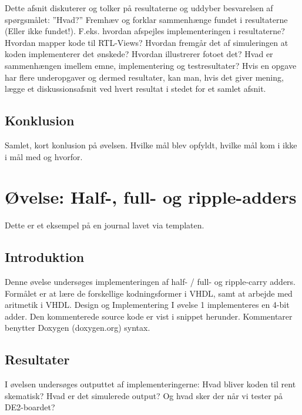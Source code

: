 \documentclass[12pt,a4paper]{article}
\begin{document}
Dette afsnit diskuterer og tolker på resultaterne og uddyber besvarelsen af
spørgsmålet: ”Hvad?” Fremhæv og forklar sammenhænge fundet i resultaterne
(Eller ikke fundet!).  F.eks.  hvordan afspejles implementeringen i
resultaterne?  Hvordan mapper kode til RTL-Views?  Hvordan fremgår det af
simuleringen at koden implementerer det ønskede?  Hvordan illustrerer fotoet
det?  Hvad er sammenhængen imellem emne, implementering og testresultater? 
Hvis en opgave har flere underopgaver og dermed resultater, kan man, hvis
det giver mening, lægge et diskussionsafsnit ved hvert resultat i stedet for
et samlet afsnit.

\subsection{Konklusion}

Samlet, kort konlusion på øvelsen.  Hvilke mål blev opfyldt, hvilke mål kom
i ikke i mål med og hvorfor.

\section{Øvelse: Half-, full- og ripple-adders}

Dette er et eksempel på en journal lavet via templaten.

\subsection{Introduktion}

Denne øvelse undersøges implementeringen af half- / full- og ripple-carry
adders.  Formålet er at lære de forskellige kodningsformer i VHDL, samt at
arbejde med aritmetik i VHDL.  Design og Implementering I øvelse 1
implementeres en 4-bit adder.  Den kommenterede source kode er vist i snippet
herunder. Kommentarer benytter Doxygen (doxygen.org) syntax.




\subsection{Resultater}

I øvelsen undersøges outputtet af implementeringerne: Hvad bliver koden til
rent skematisk?  Hvad er det simulerede output?  Og hvad sker der når vi
tester på DE2-boardet?

\end{document}
